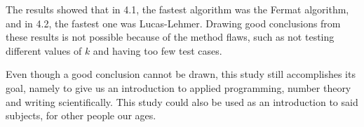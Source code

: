 \documentclass[main.tex]{subfiles}
\begin{document}
The results showed that in 4.1, the fastest algorithm was the Fermat algorithm,
and in 4.2, the fastest one was Lucas-Lehmer. Drawing good conclusions from
these results is not possible because of the method flaws, such as not testing
different values of $k$ and having too few test cases.

Even though a good conclusion cannot be drawn, this study still accomplishes its
goal, namely to give us an introduction to applied programming, number theory
and writing scientifically. This study could also be used as an introduction to
said subjects, for other people our ages. 
\end{document}
